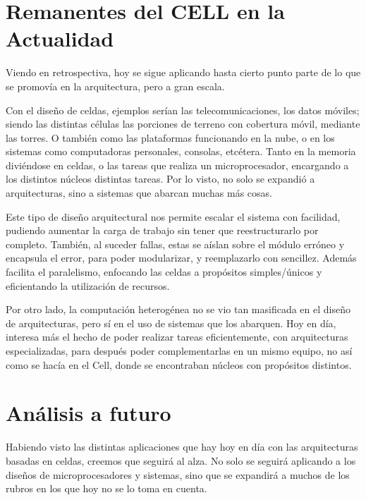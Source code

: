 \documentclass[10pt,compsoc]{IEEEtran}
\begin{document}
	
	\section{Remanentes del CELL en la Actualidad}%
	\noindent Viendo en retrospectiva, hoy se sigue aplicando hasta cierto punto parte de lo que se promovía en la arquitectura, pero a gran escala.\newline
	
	Con el diseño de celdas, ejemplos serían las telecomunicaciones, los datos móviles; siendo las distintas células las porciones de terreno con cobertura móvil, mediante las torres. O también como las plataformas funcionando en la nube, o en los sistemas como computadoras personales, consolas, etcétera. Tanto en la memoria diviéndose en celdas, o las tareas que realiza un microprocesador, encargando a los distintos núcleos distintas tareas. Por lo visto, no solo se expandió a arquitecturas, sino a sistemas que abarcan muchas más cosas.\newline
	
	Este tipo de diseño arquitectural nos permite escalar el sistema con facilidad, pudiendo aumentar la carga de trabajo sin tener que reestructurarlo por completo. También, al suceder fallas, estas se aíslan sobre el módulo erróneo y encapsula el error, para poder modularizar, y reemplazarlo con sencillez. Además facilita el paralelismo, enfocando las celdas a propósitos simples/únicos y eficientando la utilización de recursos.\newline
	
	
	Por otro lado, la computación heterogénea no se vio tan masificada en el diseño de arquitecturas, pero sí en el uso de sistemas que los abarquen. Hoy en día, interesa más el hecho de poder realizar tareas eficientemente, con arquitecturas especializadas, para después poder complementarlas en un mismo equipo, no así como se hacía en el Cell, donde se encontraban núcleos con propósitos distintos. 
		
	\section{Análisis a futuro}
	\noindent Habiendo visto las distintas aplicaciones que hay hoy en día con las arquitecturas basadas en celdas, creemos que seguirá al alza. No solo se seguirá aplicando a los diseños de microprocesadores y sistemas, sino que se expandirá a muchos de los rubros en los que hoy no se lo toma en cuenta.\newline
	
\end{document}
